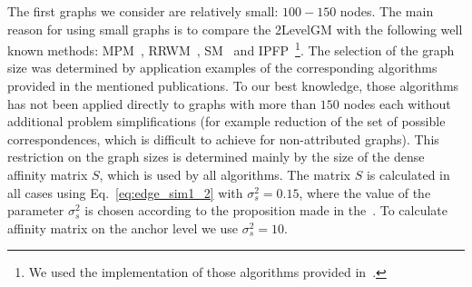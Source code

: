 The first graphs we consider are relatively small: $100-150$ nodes. The main reason for using small graphs is to compare the 2LevelGM with the following well known methods: MPM~\cite{Cho2014_Haystack}, RRWM~\cite{Cho2010_RRWM}, SM~\cite{Leordeanu2005_SM} and IPFP~\cite{Leordeanu2009_IPFP}\footnote{We used the implementation of those algorithms provided in~\cite{code_MPM}.}. The selection of the graph size was determined by application examples of the corresponding algorithms provided in the mentioned publications. To our best knowledge, those algorithms has not been applied directly to graphs with more than $150$ nodes each without additional problem simplifications (for example reduction of the set of possible correspondences, which is difficult to achieve for non-attributed graphs). This restriction on the graph sizes is determined mainly by the size of the dense affinity matrix $S$, which is used by all algorithms. The matrix $S$ is calculated in all cases using Eq.~\eqref{eq:edge_sim1_2} with $\sigma_s^2=0.15$, where the value of the parameter $\sigma_s^2$ is chosen according to the proposition made in the~\cite{Cho2010_RRWM}. To calculate affinity matrix on the anchor level we use $\sigma_s^2=10$. 

